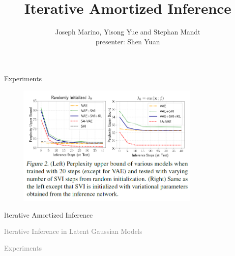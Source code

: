 \documentclass{beamer}		%
\newcommand{\light}[1]{\textcolor{gray}{#1}}
\begin{document}
\begin{frame}{Experiments}

\begin{figure}[t]
\includegraphics[width=0.8\textwidth]{figure9.png}
\label{fig1}
\end{figure}

\end{frame}



\title[Iterative Amortized Inference]{Iterative Amortized Inference}

\author[Joseph Marino, Yisong Yue and Stephan Mandt]{Joseph Marino, Yisong Yue and Stephan Mandt\\  presenter: Shen Yuan} %

\begin{frame}	

\titlepage
	
\end{frame}	



\begin{frame}[noframenumbering]
\begin{itemize}
    \begin{LARGE}
    \item Iterative Amortized Inference
    \item \light{Iterative Inference in Latent Gaussian Models}
    \item \light{Experiments}
    \end{LARGE}
\end{itemize}
\end{frame}
\end{document}
